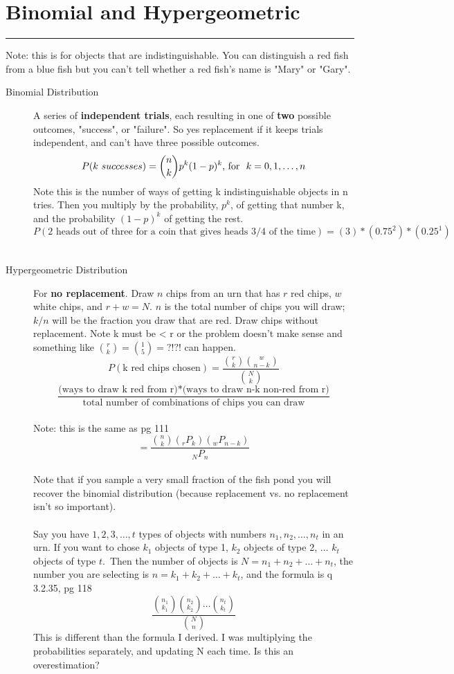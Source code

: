 \section{Binomial and Hypergeometric}\smallskip \hrule height 2pt \smallskip
Note: this is for objects that are indistinguishable.  You can distinguish a red fish from a blue fish but you can't tell whether a red fish's name is "Mary" or "Gary". 
\hfill \\
	\begin{description}
		\item[Binomial Distribution] A series of \textbf{independent trials}, each resulting in one of \textbf{two} possible outcomes, "success", or "failure".  So yes replacement if it keeps trials independent, and can't have three possible outcomes. 
			\[ P(k \mbox \ successes) = {{n}\choose{k}}p^k(1-p)^k \mbox{, for \ } k = 0, 1, \dots, n \]
		Note this is the number of ways of getting k indistinguishable objects in n tries.  Then you multiply by the probability, $p^k$, of getting that number k, and the probability $(1-p)^k$ of getting the rest.  $P(\mbox{2 heads out of three for a coin that gives heads 3/4 of the time}) = (3)*(0.75^2)*(0.25^1)$ \hfill \\
		\hfill \\
		\item[Hypergeometric Distribution]  For \textbf{no replacement}.  Draw $n$ chips from an urn that has $r$ red chips, $w$ white chips, and $r + w = N$.   $n$ is the total number of chips you will draw; $k/n$ will be the fraction you draw that are red. Draw chips without replacement.  Note k must be < r or the problem doesn't make sense and something like ${{r} \choose {k}} = {{1} \choose {5}} = ?!?!$ can happen.  
			\[ P(\mbox{k red chips chosen}) = \frac{ {{r} \choose {k}} {{w} \choose {n-k}} }{{{N}\choose{k}}} \] %
			\[ \frac{\mbox{(ways to draw \ k red from r)}*\mbox{(ways to draw n-k non-red from r)}}{\mbox{total number of combinations of chips you can draw}} \] \hfill \\
		Note: this is the same as	{\tiny pg 111}
		\[ = \frac{ {{n} \choose {k}} ({{_r}P_{k}}) ({{_w}P_{n-k}}) }{{{_N}P_n}} \] 
			\hfill \\
		Note that if you sample a very small fraction of the fish pond you will recover the binomial distribution (because replacement vs. no replacement isn't so important). \hfill \\
		\hfill \\
		Say you have $1, 2, 3, \dots, t$ types of objects with numbers $n_1, n_2, \dots, n_t$ in an urn.
		If you want to chose $k_1$ objects of  type 1, $k_2$ objects of  type 2, $\dots$ $k_t$ objects of  type $t$.\
		Then the number of objects is $N = n_1 + n_2 + \dots + n_t$, the number you are selecting is $n = k_1+ k_2 + \dots + k_t$, and  the formula is   {\tiny q 3.2.35, pg 118}
		\[  \frac{ {{n_1}\choose{k_1}} {{n_2}\choose{k_2}} \dots {{n_t}\choose{k_t}} }{ {{N}\choose{n}} }  \]
		This is different than the formula I derived.  I was multiplying the probabilities separately, and updating N each time.  Is this an overestimation? 
		
		
	\end{description}
	
